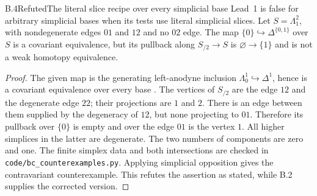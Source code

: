 \begin{claim}{B.4}{Refuted}{The literal slice recipe over every simplicial base}
Lead~1 is false for arbitrary simplicial bases when its tests use literal
simplicial slices. Let $S=\Lambda^2_1$, with nondegenerate edges $01$ and
$12$ and no $02$ edge. The map $\{0\}\hookrightarrow\Delta^{\{0,1\}}$
over $S$ is a covariant equivalence, but its pullback along $S_{/2}\to S$
is $\varnothing\to\{1\}$ and is not a weak homotopy equivalence.
\end{claim}
\begin{proof}
The given map is the generating left-anodyne inclusion
$\Lambda^1_0\hookrightarrow\Delta^1$, hence is a covariant equivalence
over every base \citep[Proposition 2.1.4.9]{DGLurieHTT}.
The vertices of $S_{/2}$ are the edge $12$ and the degenerate edge $22$;
their projections are $1$ and $2$. There is an edge between them supplied by
the degeneracy of $12$, but none projecting to $01$. Therefore its pullback
over $\{0\}$ is empty and over the edge $01$ is the vertex $1$.
All higher simplices in the latter are degenerate. The two numbers of
components are zero and one. The finite simplex data and both intersections
are checked in \texttt{code/bc\_counterexamples.py}.
Applying simplicial opposition gives the contravariant counterexample.
This refutes the assertion as stated, while B.2 supplies the corrected version.
\end{proof}

